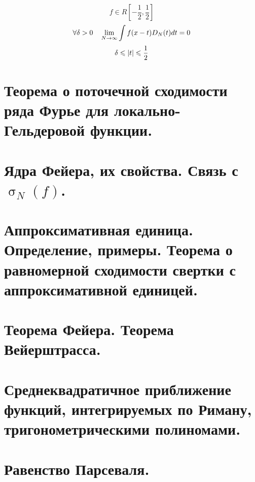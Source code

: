 \documentclass[matan, 12pt, fleqn]{subfiles}
\begin{document}
\begin{Lemma}
    \[f \in R[-\frac{1}{2}, \frac{1}{2}]\]    
    \[\forall \delta > 0 \quad \lim_{N \to \infty} \int f(x - t)D_N(t)dt = 0 \]
    \[\delta \leqslant \left|t\right| \leqslant \frac{1}{2}\]
\end{Lemma}

\newpage
\section{Теорема о поточечной сходимости ряда Фурье для локально-Гельдеровой функции.}


\newpage
\section{Ядра Фейера, их свойства. Связь с $\upsigma_N(f)$.}


\newpage
\section{Аппроксимативная единица. Определение, примеры. Теорема о равномерной сходимости свертки с аппроксимативной единицей.}


\newpage
\section{Теорема Фейера. Теорема Вейерштрасса.}


\newpage
\section{Среднеквадратичное приближение функций, интегрируемых по Риману, тригонометрическими полиномами.}


\newpage
\section{Равенство Парсеваля.}
\end{document}
